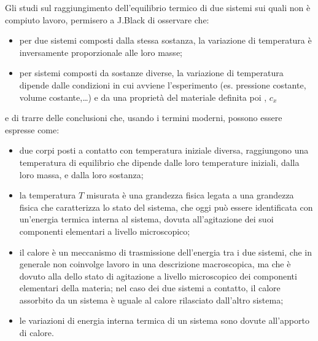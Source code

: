 \documentclass[letterpaper,10pt,italian]{jupyterBook}
\begin{document}
\sphinxAtStartPar
Gli studi sul raggiungimento dell’equilibrio termico di due sistemi sui quali non è compiuto lavoro, permisero a J.Black di osservare che:
\begin{itemize}
\item {} 
\sphinxAtStartPar
per due sistemi composti dalla stessa sostanza, la variazione di temperatura è inversamente proporzionale alle loro masse;

\item {} 
\sphinxAtStartPar
per sistemi composti da sostanze diverse, la variazione di temperatura dipende dalle condizioni in cui avviene l’esperimento (es. pressione costante, volume costante,…) e da una proprietà del materiale definita poi , \(c_x\)

\end{itemize}

\sphinxAtStartPar
e di trarre delle conclusioni che, usando i termini moderni, possono essere espresse come:
\begin{itemize}
\item {} 
\sphinxAtStartPar
due corpi posti a contatto con temperatura iniziale diversa, raggiungono una temperatura di equilibrio che dipende dalle loro temperature iniziali, dalla loro massa, e dalla loro sostanza;

\item {} 
\sphinxAtStartPar
la temperatura \(T\) misurata è una grandezza fisica legata a una grandezza fisica che caratterizza lo stato del sistema, che oggi può essere identificata con un’energia termica interna al sistema, dovuta all’agitazione dei suoi componenti elementari a livello microscopico;

\item {} 
\sphinxAtStartPar
il calore è un meccanismo di trasmissione dell’energia tra i due sistemi, che in generale non coinvolge lavoro in una descrizione macroscopica, ma che è dovuto alla  dello stato di agitazione a livello microscopico dei componenti elementari della materia; nel caso dei due sistemi a contatto, il calore assorbito da un sistema è uguale al calore rilasciato dall’altro sistema;

\item {} 
\sphinxAtStartPar
le variazioni di energia interna termica di un sistema sono dovute all’apporto di calore.

\end{itemize}
\end{document}
